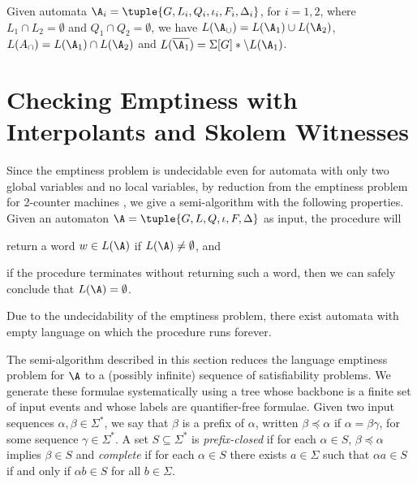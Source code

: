 \begin{lemma}\label{lemma:boolean-closure}
  Given automata $\A_i = \tuple{G,L_i,Q_i,\iota_i,F_i,\Delta_i}$, for
  $i=1,2$, where $L_1 \cap L_2 = \emptyset$ and $Q_1 \cap Q_2 =
  \emptyset$, we have $L(\A_\cup) = L(\A_1) \cup L(\A_2)$, $L(A_\cap)
  = L(\A_1) \cap L(\A_2)$ and $L(\overline{\A_1}) = \Sigma[G]*
  \setminus L(\A_1)$. 
\end{lemma}

\section{Checking Emptiness with Interpolants and Skolem Witnesses}

Since the emptiness problem is undecidable even for automata with only
two global variables and no local variables, by reduction from the
emptiness problem for 2-counter machines \cite{Minsky67}, we give a
semi-algorithm with the following properties. Given an automaton $\A =
\tuple{G,L,Q,\iota,F,\Delta}$ as input, the procedure
will\begin{inparaenum}[(1)]
\item return a word $w \in L(\A)$ if $L(\A) \neq \emptyset$, and
%
\item if the procedure terminates without returning such a word, then
  we can safely conclude that $L(\A) = \emptyset$. \end{inparaenum}
Due to the undecidability of the emptiness problem, there exist
automata with empty language on which the procedure runs forever.

The semi-algorithm described in this section reduces the language
emptiness problem for $\A$ to a (possibly infinite) sequence of
satisfiability problems. We generate these formulae systematically
using a tree whose backbone is a finite set of input events and whose
labels are quantifier-free formulae. Given two input sequences
$\alpha,\beta \in \Sigma^*$, we say that $\beta$ is a prefix of
$\alpha$, written $\beta \preceq \alpha$ if $\alpha = \beta \gamma$,
for some sequence $\gamma \in \Sigma^*$. A set $S \subseteq \Sigma^*$
is \emph{prefix-closed} if for each $\alpha \in S$, $\beta \preceq
\alpha$ implies $\beta \in S$ and \emph{complete} if for each $\alpha
\in S$ there exists $a \in \Sigma$ such that $\alpha a \in S$ if and
only if $\alpha b \in S$ for all $b \in \Sigma$. 

